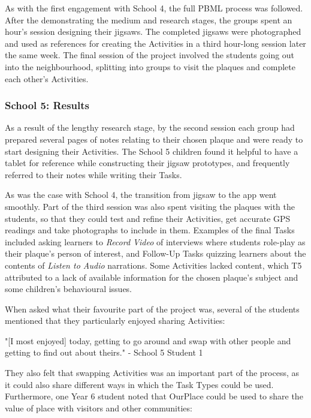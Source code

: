 As with the first engagement with School 4, the full PBML process was followed. After the demonstrating the medium and research stages, the groups spent an hour's session designing their jigsaws. The completed jigsaws were photographed and used as references for creating the Activities in a third hour-long session later the same week. The final session of the project involved the students going out into the neighbourhood, splitting into groups to visit the plaques and complete each other's Activities.

\subsubsection{School 5: Results}

As a result of the lengthy research stage, by the second session each group had prepared several pages of notes relating to their chosen plaque and were ready to start designing their Activities. The School 5 children found it helpful to have a tablet for reference while constructing their jigsaw prototypes, and frequently referred to their notes while writing their Tasks. 

As was the case with School 4, the transition from jigsaw to the app went smoothly. Part of the third session was also spent visiting the plaques with the students, so that they could test and refine their Activities, get accurate GPS readings and take photographs to include in them. Examples of the final Tasks included asking learners to \textit{Record Video} of interviews where students role-play as their plaque's person of interest, and Follow-Up Tasks quizzing learners about the contents of \textit{Listen to Audio} narrations. Some Activities lacked content, which T5 attributed to a lack of available information for the chosen plaque's subject and some children's behavioural issues.

When asked what their favourite part of the project was, several of the students mentioned that they particularly enjoyed sharing Activities: 

\begin{displayquote}
"[I most enjoyed] today, getting to go around and swap with other people and getting to find out about theirs." - School 5 Student 1
\end{displayquote}

They also felt that swapping Activities was an important part of the process, as it could also share different ways in which the Task Types could be used. Furthermore, one Year 6 student noted that OurPlace could be used to share the value of place with visitors and other communities: 

